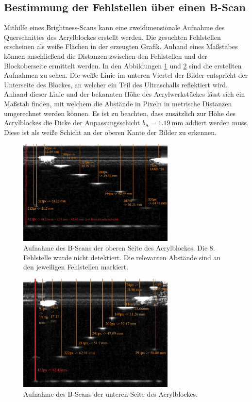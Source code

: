 \subsection{Bestimmung der Fehlstellen über einen B-Scan}
\label{subsec:b_scan}
Mithilfe eines Brightness-Scans kann eine zweidimensionale Aufnahme des Querschnittes des Acrylblockes erstellt werden. Die gesuchten Fehlstellen erscheinen als 
weiße Flächen in der erzeugten Grafik. Anhand eines Maßstabes können anschließend die Distanzen zwischen den Fehlstellen und der Blockoberseite ermittelt werden.
In den Abbildungen \ref{fig:B_Scan_oben} und \ref{fig:B_Scan_unten} sind die erstellten Aufnahmen zu sehen. Die weiße Linie im unteren Viertel der Bilder entspricht
der Unterseite des Blockes, an welcher ein Teil des Ultraschalls reflektiert wird. Anhand dieser Linie und der bekannten Höhe des Acrylwerkstückes lässt sich ein
Maßstab finden, mit welchem die Abstände in Pixeln in metrische Distanzen umgerechnet werden können. Es ist zu beachten, dass zusätzlich zur Höhe des Acrylblockes
die Dicke der Anpassungsschicht $b_\text{A} = \qty{1.19}{\milli\metre}$ addiert werden muss. Diese ist als weiße Schicht an der oberen Kante der Bilder zu erkennen.

\begin{figure}
  \centering
\includegraphics[width=0.7\textwidth]{content/B_Scan_oben_auswertung.pdf}
  \caption{Aufnahme des B-Scans der oberen Seite des Acrylblockes. Die 8. Fehlstelle wurde nicht detektiert.
  Die relevanten Abstände sind an den jeweiligen Fehlstellen markiert.}
  \label{fig:B_Scan_oben}
\end{figure}

\begin{figure}
  \centering
\includegraphics[width=0.7\textwidth]{content/B_Scan_unten_auswertung.pdf}
  \caption{Aufnahme des B-Scans der unteren Seite des Acrylblockes.}
  \label{fig:B_Scan_unten}
\end{figure}


